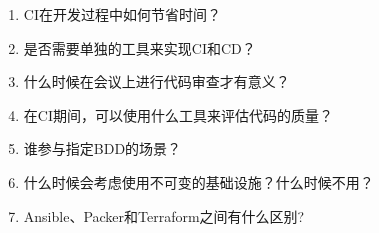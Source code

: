 \begin{enumerate}
\item
CI在开发过程中如何节省时间？

\item
是否需要单独的工具来实现CI和CD？

\item
什么时候在会议上进行代码审查才有意义？

\item
在CI期间，可以使用什么工具来评估代码的质量？

\item
谁参与指定BDD的场景？

\item
什么时候会考虑使用不可变的基础设施？什么时候不用？

\item
Ansible、Packer和Terraform之间有什么区别?
\end{enumerate}